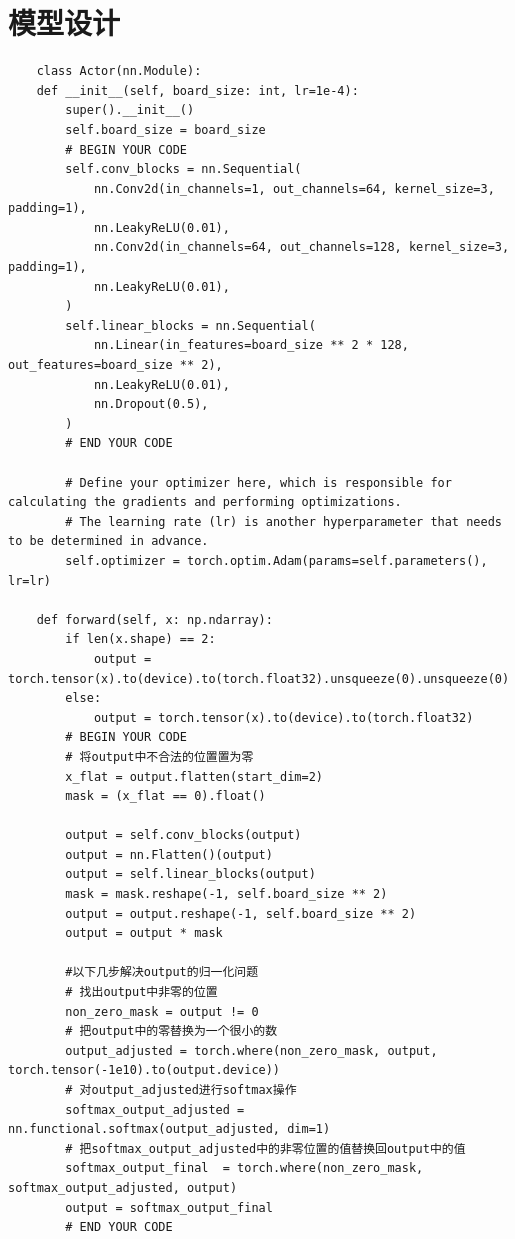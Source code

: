 \documentclass{ctexart}
\begin{document}
\section{模型设计}
\begin{lstlisting}
	class Actor(nn.Module):
    def __init__(self, board_size: int, lr=1e-4):
        super().__init__()
        self.board_size = board_size
        # BEGIN YOUR CODE
        self.conv_blocks = nn.Sequential(
            nn.Conv2d(in_channels=1, out_channels=64, kernel_size=3, padding=1),
            nn.LeakyReLU(0.01),
            nn.Conv2d(in_channels=64, out_channels=128, kernel_size=3, padding=1),
            nn.LeakyReLU(0.01),
        )
        self.linear_blocks = nn.Sequential(
            nn.Linear(in_features=board_size ** 2 * 128, out_features=board_size ** 2),
            nn.LeakyReLU(0.01),
            nn.Dropout(0.5),
        )
        # END YOUR CODE

        # Define your optimizer here, which is responsible for calculating the gradients and performing optimizations.
        # The learning rate (lr) is another hyperparameter that needs to be determined in advance.
        self.optimizer = torch.optim.Adam(params=self.parameters(), lr=lr)

    def forward(self, x: np.ndarray):
        if len(x.shape) == 2:
            output = torch.tensor(x).to(device).to(torch.float32).unsqueeze(0).unsqueeze(0)
        else:
            output = torch.tensor(x).to(device).to(torch.float32)
		# BEGIN YOUR CODE
		# 将output中不合法的位置置为零
        x_flat = output.flatten(start_dim=2)
        mask = (x_flat == 0).float()
        
        output = self.conv_blocks(output)
        output = nn.Flatten()(output)
        output = self.linear_blocks(output)
        mask = mask.reshape(-1, self.board_size ** 2)
        output = output.reshape(-1, self.board_size ** 2)
        output = output * mask

		#以下几步解决output的归一化问题
        # 找出output中非零的位置
        non_zero_mask = output != 0
        # 把output中的零替换为一个很小的数
        output_adjusted = torch.where(non_zero_mask, output, torch.tensor(-1e10).to(output.device))
        # 对output_adjusted进行softmax操作
        softmax_output_adjusted = nn.functional.softmax(output_adjusted, dim=1)
        # 把softmax_output_adjusted中的非零位置的值替换回output中的值
        softmax_output_final  = torch.where(non_zero_mask, softmax_output_adjusted, output)
        output = softmax_output_final
        # END YOUR CODE


\end{lstlisting}
\end{document}
